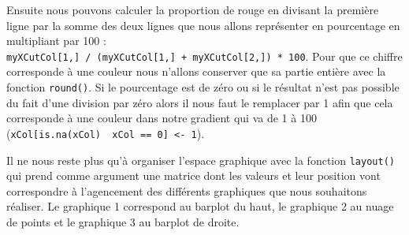 \documentclass[]{book}
\theoremstyle{definition}
\theoremstyle{definition}
\theoremstyle{definition}
\theoremstyle{remark}
\begin{document}
Ensuite nous pouvons calculer la proportion de rouge en divisant la
première ligne par la somme des deux lignes que nous allons représenter
en pourcentage en multipliant par 100 :
\texttt{myXCutCol{[}1,{]}\ /\ (myXCutCol{[}1,{]}\ +\ myXCutCol{[}2,{]})\ *\ 100}.
Pour que ce chiffre corresponde à une couleur nous n'allons conserver
que sa partie entière avec la fonction \texttt{round()}. Si le
pourcentage est de zéro ou si le résultat n'est pas possible du fait
d'une division par zéro alors il nous faut le remplacer par 1 afin que
cela corresponde à une couleur dans notre gradient qui va de 1 à 100
(\texttt{xCol{[}is.na(xCol)\ \textbar{}\ xCol\ ==\ 0{]}\ \textless{}-\ 1}).

Il ne nous reste plus qu'à organiser l'espace graphique avec la fonction
\texttt{layout()} qui prend comme argument une matrice dont les valeurs
et leur position vont correspondre à l'agencement des différents
graphiques que nous souhaitons réaliser. Le graphique 1 correspond au
barplot du haut, le graphique 2 au nuage de points et le graphique 3 au
barplot de droite.
\end{document}
